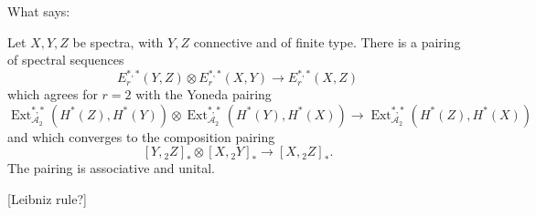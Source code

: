 \documentclass{MetricNotes2023}
\def\bb{\ensuremath\mathbb}
\def\A{\ensuremath{\mathscr{A}_2}}
\DeclareMathOperator{\Ext}{Ext}
\begin{document}
What \autocite{ass} says:

\begin{theorem}
Let \(X,Y,Z\) be spectra, with \(Y, Z\) connective and of finite type. There is a pairing of spectral sequences
\[E^{*,*}_r(Y,Z)\otimes E^{*,*}_r(X,Y)\to E^{*,*}_r(X,Z)\]
which agrees for \(r=2\) with the Yoneda pairing
\[\Ext^{*,*}_{\A}(H^*(Z), H^*(Y))\otimes \Ext_{\A}^{*,*}(H^*(Y), H^*(X))\to \Ext_{\A}^{*,*}(H^*(Z), H^*(X))\]
and which converges%
to the composition pairing
\[[Y, \text{}_2Z]_*\otimes [X,\text{}_2Y]_* \to [X, \text{}_2Z]_*.\]
The pairing is associative and unital.
\end{theorem}

[Leibniz rule?]







\end{document}
